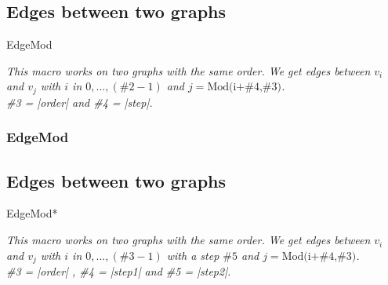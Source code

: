 \newpage
\subsection{Edges between two graphs }%
\begin{NewMacroBox}{EdgeMod}{}

\medskip
\emph{This macro works on two graphs with the same order. We get edges between $v_i$ and $v_j$ with $i$ in $0,...,(\text{\#2}-1)$  and $j=\text{Mod(i+\#4,\#3)}$.\\
\#3 = |order| and  \#4 = |step|.}
\end{NewMacroBox}

\subsubsection{EdgeMod}
\begin{center}
\begin{tkzexample}[vbox]
\end{tkzexample}
\end{center}

\newpage
\subsection{Edges between two graphs }%
\begin{NewMacroBox}{EdgeMod*}{}

\medskip
\emph{This macro works on two graphs with the same order. We get edges between $v_i$ and $v_j$ with $i$ in $0,...,(\text{\#3}-1)$ with a step $\text{\#5}$ and $j=\text{Mod(i+\#4,\#3)}$.\\
\#3 = |order| ,  \#4 = |step1| and \#5 = |step2|.}
\end{NewMacroBox}


\subsubsection{ }%
\begin{center}
\begin{tkzexample}[vbox]
\end{tkzexample}
\end{center}


